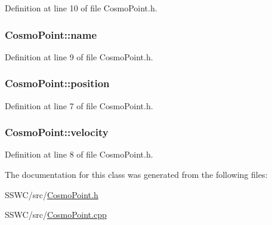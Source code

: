 Definition at line 10 of file Cosmo\+Point.\+h.

\hypertarget{class_cosmo_point_a4f8ea23c00479e2dce987e0db8b8a621}{
\subsubsection[{name}]{ Cosmo\+Point\+::name}}\label{class_cosmo_point_a4f8ea23c00479e2dce987e0db8b8a621}


Definition at line 9 of file Cosmo\+Point.\+h.

\hypertarget{class_cosmo_point_a3927ca95564570083312401e1f10aaaa}{
\subsubsection[{position}]{ Cosmo\+Point\+::position}}\label{class_cosmo_point_a3927ca95564570083312401e1f10aaaa}


Definition at line 7 of file Cosmo\+Point.\+h.

\hypertarget{class_cosmo_point_a902bd391f682c0d60924bb43758e49f5}{
\subsubsection[{velocity}]{ Cosmo\+Point\+::velocity}}\label{class_cosmo_point_a902bd391f682c0d60924bb43758e49f5}


Definition at line 8 of file Cosmo\+Point.\+h.



The documentation for this class was generated from the following files\+:\begin{DoxyCompactItemize}
\item 
S\+S\+W\+C/src/\hyperlink{_cosmo_point_8h}{Cosmo\+Point.\+h}\item 
S\+S\+W\+C/src/\hyperlink{_cosmo_point_8cpp}{Cosmo\+Point.\+cpp}\end{DoxyCompactItemize}
